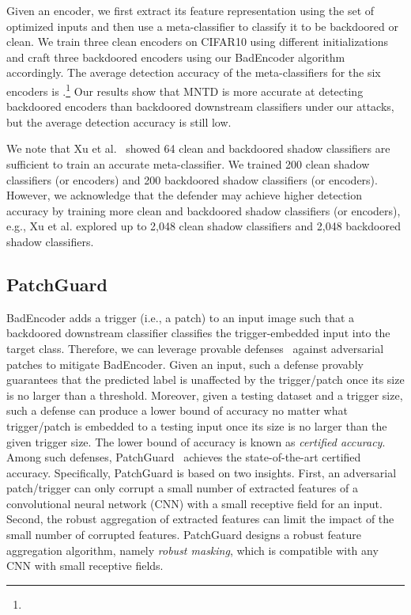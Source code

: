 Given an encoder, we first extract its feature representation using the set of optimized inputs and then use a meta-classifier to classify it to be backdoored or clean. We train three clean encoders on CIFAR10 using different initializations and craft three backdoored encoders using our BadEncoder algorithm accordingly. The average detection accuracy of the  meta-classifiers for the six encoders is .\footnote{} Our results show that MNTD is  more accurate at detecting backdoored encoders than backdoored downstream classifiers under our attacks, but the average detection accuracy is still low. 


We note that Xu et al.~\cite{xu2019detecting} showed 64 clean and backdoored shadow classifiers are sufficient to train an accurate meta-classifier. We trained 200 clean shadow classifiers (or encoders) and 200 backdoored shadow classifiers (or encoders). However, we acknowledge that the defender may achieve higher detection accuracy by training more clean and backdoored shadow classifiers (or encoders), e.g., Xu et al. explored up to 2,048 clean shadow classifiers and 2,048 backdoored shadow classifiers.  




\subsection{PatchGuard}
BadEncoder adds a trigger (i.e., a patch) to an input image such that a backdoored downstream classifier classifies the trigger-embedded input into the target class. Therefore, we can leverage provable defenses~\cite{chiang2019certified,levine2020randomized,xiang2020patchguard,metzen2021efficient} against adversarial patches to mitigate BadEncoder. Given an input, such a defense provably guarantees that the predicted label is unaffected by the trigger/patch once its size is no larger than a threshold. Moreover, given a testing dataset and a trigger size, such a defense can produce a lower bound of accuracy no matter what trigger/patch is embedded to a testing input once its size is no larger than the given trigger size. The lower bound of accuracy is known as \emph{certified accuracy}.  
Among such defenses, PatchGuard~\cite{xiang2020patchguard} achieves the state-of-the-art certified accuracy. Specifically, PatchGuard is based on two insights. First, an adversarial patch/trigger can only corrupt a small number of extracted features of a convolutional neural network (CNN) with a small receptive field for an input. Second, the robust aggregation of extracted features can limit the impact of the small number of corrupted features. PatchGuard designs a robust feature aggregation algorithm, namely \emph{robust masking}, which is compatible with any CNN with small receptive fields. 


